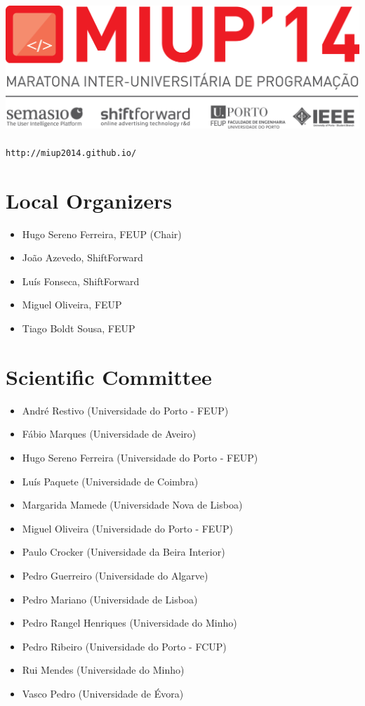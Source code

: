 \documentclass[11pt]{report}
\begin{document}
\begin{titlepage}
\begin{center}
\vspace*{2.5in}
\includegraphics[width=1.0\textwidth]{LOGO_withSponsors.png}~\\[1cm]
\texttt{http://miup2014.github.io/}
\end{center}
\end{titlepage}

\tableofcontents
\clearpage

\section*{Local Organizers}

\begin{itemize}
\item Hugo Sereno Ferreira, FEUP (Chair)
\item João Azevedo, ShiftForward
\item Luís Fonseca, ShiftForward
\item Miguel Oliveira, FEUP
\item Tiago Boldt Sousa, FEUP
\end{itemize}

\section*{Scientific Committee}

\begin{itemize}
\item André Restivo (Universidade do Porto - FEUP)
\item Fábio Marques (Universidade de Aveiro)
\item Hugo Sereno Ferreira (Universidade do Porto - FEUP)
\item Luís Paquete (Universidade de Coimbra)
\item Margarida Mamede (Universidade Nova de Lisboa)
\item Miguel Oliveira (Universidade do Porto - FEUP)
\item Paulo Crocker (Universidade da Beira Interior)
\item Pedro Guerreiro (Universidade do Algarve)
\item Pedro Mariano (Universidade de Lisboa)
\item Pedro Rangel Henriques (Universidade do Minho)
\item Pedro Ribeiro (Universidade do Porto - FCUP)
\item Rui Mendes (Universidade do Minho)
\item Vasco Pedro (Universidade de Évora)
\end{itemize}
\end{document}
